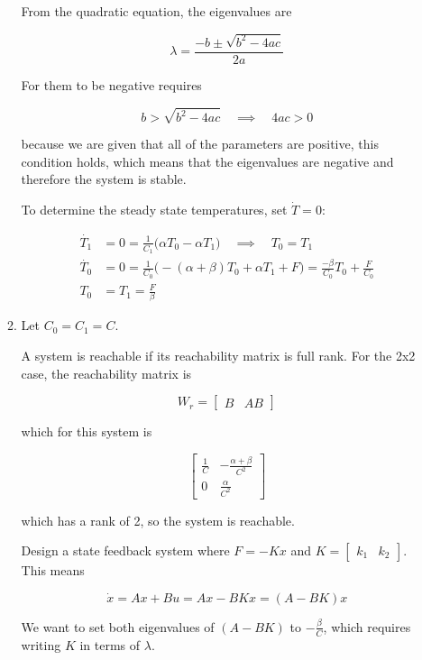 \documentclass[11pt]{article}
\theoremstyle{definition}
\begin{document}
\begin{enumerate}
\begin{enumerate}
        From the quadratic equation, the eigenvalues are

        $$ \lambda = \frac{-b \pm \sqrt{b^2 - 4ac}}{2a} $$

        For them to be negative requires

        $$ b > \sqrt{b^2 - 4ac} \quad \implies \quad 4ac > 0 $$

        because we are given that all of the parameters are positive, this condition holds, which means that the eigenvalues are negative and therefore the system is stable.

        To determine the steady state temperatures, set $\dot{T} = 0$:

        \begin{align*}
            \dot{T_1} &= 0 = \frac{1}{C_1} \big( \alpha T_0 - \alpha T_1 \big) \quad \implies \quad T_0 = T_1 \\
            \dot{T_0} &= 0 = \frac{1}{C_0} \big( -(\alpha + \beta) T_0 + \alpha T_1 + F \big) = \frac{-\beta}{C_0}T_0 + \frac{F}{C_0} \\
            T_0 &= T_1 = \frac{F}{\beta}
        \end{align*}

        \item %
        Let $C_0 = C_1 = C$.

        A system is reachable if its reachability matrix is full rank.  For the 2x2 case, the reachability matrix is

        $$ W_r = \begin{bmatrix} B & AB \end{bmatrix} $$

        which for this system is

        $$ \begin{bmatrix} \frac{1}{C} & - \frac{\alpha + \beta}{C^2} \\ 0 & \frac{\alpha}{C^2}  \end{bmatrix} $$

        which has a rank of 2, so the system is reachable.

        Design a state feedback system where $F = -Kx$ and $K = \begin{bmatrix} k_1 & k_2 \end{bmatrix}$.  This means

        $$ \dot{x} = Ax + Bu = Ax - BKx = (A - BK)x $$

        We want to set both eigenvalues of $(A - BK)$ to $- \frac{\beta}{C}$, which requires writing $K$ in terms of $\lambda$.  


\end{enumerate}
\end{enumerate}
\end{document}
